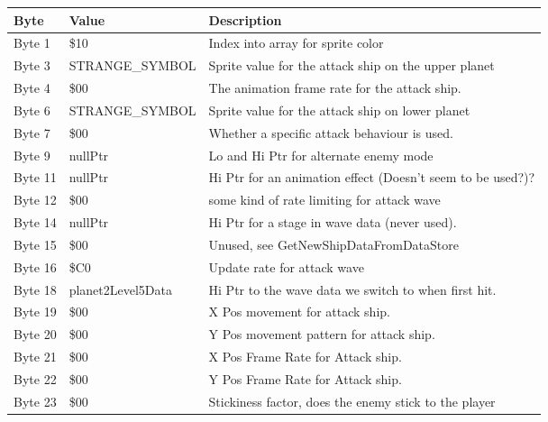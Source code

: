\begin{figure}[H]
{\begin{adjustbox}{width=12cm}
\begin{tabular}{lll}
\toprule
 Byte    & Value              & Description                                                        \\
\midrule
 Byte 1  & \$10                & Index into array for sprite color                                  \\
 Byte 3  & STRANGE\_SYMBOL     & Sprite value for the attack ship on the upper planet               \\
 Byte 4  & \$00                & The animation frame rate for the attack ship.                      \\
 Byte 6  & STRANGE\_SYMBOL     & Sprite value for the attack ship on lower planet                   \\
 Byte 7  & \$00                & Whether a specific attack behaviour is used.                       \\
 Byte 9  & nullPtr            & Lo and Hi Ptr for alternate enemy mode                             \\
 Byte 11 & nullPtr            & Hi Ptr for an animation effect (Doesn't seem to be used?)?         \\
 Byte 12 & \$00                & some kind of rate limiting for attack wave                         \\
 Byte 14 & nullPtr            & Hi Ptr for a stage in wave data (never used).                      \\
 Byte 15 & \$00                & Unused, see GetNewShipDataFromDataStore                            \\
 Byte 16 & \$C0                & Update rate for attack wave                                        \\
 Byte 18 & planet2Level5Data  & Hi Ptr to the wave data we switch to when first hit.               \\
 Byte 19 & \$00                & X Pos movement for attack ship.                                    \\
 Byte 20 & \$00                & Y Pos movement pattern for attack ship.                            \\
 Byte 21 & \$00                & X Pos Frame Rate for Attack ship.                                  \\
 Byte 22 & \$00                & Y Pos Frame Rate for Attack ship.                                  \\
 Byte 23 & \$00                & Stickiness factor, does the enemy stick to the player              \\

\end{tabular}
\end{adjustbox}}
\end{figure}
